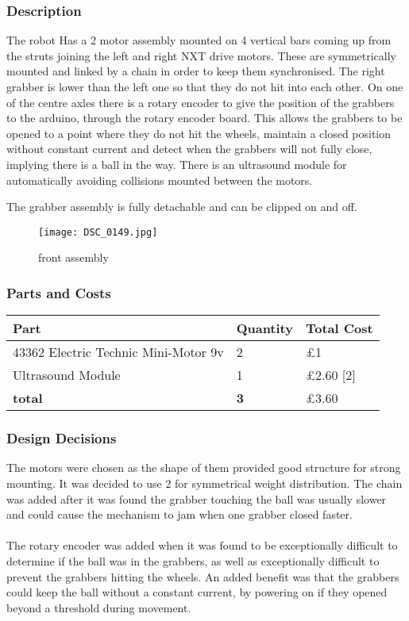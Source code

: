 \subsubsection{Description}
The robot Has a 2 motor assembly mounted on 4 vertical bars coming up from the struts joining the left and right NXT drive motors. These are symmetrically mounted and linked by a chain in order to keep them synchronised. The right grabber is lower than the left one so that they do not hit into each other. On one of the centre axles there is a rotary encoder to give the position of the grabbers to the arduino, through the rotary encoder board. This allows the grabbers to be opened to a point where they do not hit the wheels, maintain a closed position without constant current and detect when the grabbers will not fully close, implying there is a ball in the way. There is an ultrasound module for automatically avoiding collisions mounted between the motors. 

The grabber assembly is fully detachable and can be clipped on and off. 
\begin{figure}[!ht]
\caption{front assembly}
\centering
\texttt{[image: DSC\_0149.jpg]}
\end{figure}

\subsubsection{Parts and Costs}

\begin{center}
\begin{tabular}{ | m{3cm} | m{3cm}| m{6cm} | }
\hline
\textbf{Part} & \textbf{Quantity} & \textbf{Total Cost} \\
\hline
43362 Electric Technic Mini-Motor 9v & 2 & £1 \\
\hline
Ultrasound Module       & 1 & £2.60 [2]\\
\hline
\textbf{total} & \textbf{3} & £3.60 \\
\hline
\end{tabular}
\end{center}

\subsubsection{Design Decisions}
The motors were chosen as the shape of them provided good structure for strong mounting. It was decided to use 2 for symmetrical weight distribution. The chain was added after it was found the grabber touching the ball was usually slower and could cause the mechanism to jam when one grabber closed faster.
\\ \\
The rotary encoder was added when it was found to be exceptionally difficult to determine if the ball was in the grabbers, as well as exceptionally difficult to prevent the grabbers hitting the wheels. An added benefit was that the grabbers could keep the ball without a constant current, by powering on if they opened beyond a threshold during movement. 

